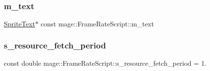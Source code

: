 \hypertarget{classmage_1_1_frame_rate_script_ae54fff9f8485d86c664057fa8d001bf9}{}\label{classmage_1_1_frame_rate_script_ae54fff9f8485d86c664057fa8d001bf9} 
\subsubsection{\texorpdfstring{m\+\_\+text}{m\_text}}
{\footnotesize\ttfamily \hyperlink{classmage_1_1_sprite_text}{Sprite\+Text}$\ast$ const mage\+::\+Frame\+Rate\+Script\+::m\+\_\+text\hspace{0.3cm}{\ttfamily [private]}}

\hypertarget{classmage_1_1_frame_rate_script_ad28027c538faeab0c74bdb7b49f59469}{}\label{classmage_1_1_frame_rate_script_ad28027c538faeab0c74bdb7b49f59469} 
\subsubsection{\texorpdfstring{s\+\_\+resource\+\_\+fetch\+\_\+period}{s\_resource\_fetch\_period}}
{\footnotesize\ttfamily const double mage\+::\+Frame\+Rate\+Script\+::s\+\_\+resource\+\_\+fetch\+\_\+period = 1.\hspace{0.3cm}{\ttfamily [static]}}

